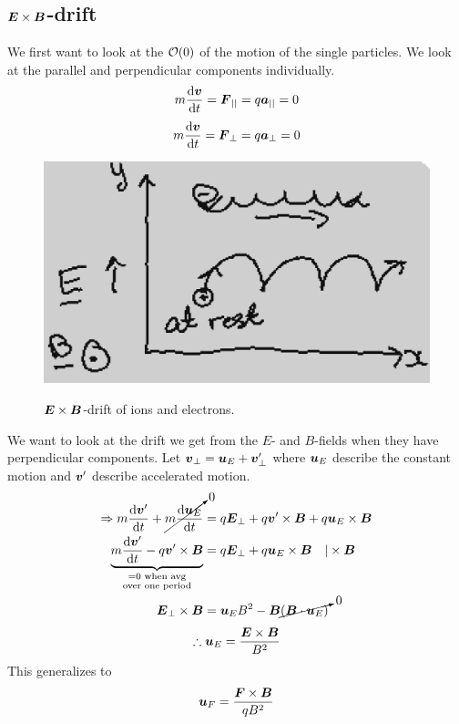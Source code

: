 \subsection{\(\boldsymbol{E}\times\boldsymbol{B}\)-drift}
We first want to look at the \(\mathcal{O}(0)\) of the motion of the single particles. We look at the parallel and perpendicular components individually. \boxed{\vert\vert:}
\begin{equation*}
    m\frac{\text{d}\boldsymbol{v}}{\text{d}t}=\boldsymbol{F}_{\vert\vert}=q\boldsymbol{a}_{\vert\vert}=0
\end{equation*}
\boxed{\perp:}
\begin{equation*}
    m\frac{\text{d}\boldsymbol{v}}{\text{d}t}=\boldsymbol{F}_\perp=q\boldsymbol{a}_\perp=0
\end{equation*}
\begin{figure}[t]
    \centering
    \includegraphics[width=0.2\linewidth]{bilder/ExB.jpg}\label{fig:ExB}
    \caption{\(\boldsymbol{E}\times\boldsymbol{B}\)-drift of ions and electrons.}
\end{figure}
We want to look at the drift we get from the \(E\)- and \(B\)-fields when they have perpendicular components. Let \(\boldsymbol{v}_\perp=\boldsymbol{u}_E+\boldsymbol{v}_\perp'\) where \(\boldsymbol{u}_E\) describe the constant motion and \(\boldsymbol{v}'\) describe accelerated motion.
\begin{align*}
    \Rightarrow m\frac{\text{d}\boldsymbol{v}'}{\text{d}t}+\cancelto{0}{m\frac{\textnormal{d}\boldsymbol{u}_E}{\textnormal{d}t}}&=q\boldsymbol{E}_\perp+q\boldsymbol{v}'\times\boldsymbol{B}+q\boldsymbol{u}_E\times\boldsymbol{B}\\
    \underbrace{m\frac{\textnormal{d}\boldsymbol{v}'}{\textnormal{d}t}-q\boldsymbol{v}'\times\boldsymbol{B}}_{\substack{=0 \textnormal{ when avg} \\\textnormal{over one period}}}&=q\boldsymbol{E}_\perp+q\boldsymbol{u}_E\times\boldsymbol{B}\quad\vert\times\boldsymbol{B}\\
    \boldsymbol{E}_\perp\times\boldsymbol{B}&=\boldsymbol{u}_{E}B^2-\boldsymbol{B}\cancelto{0}{(\boldsymbol{B}\cdot\boldsymbol{u}_E)}
\end{align*}
\begin{equation*}
    \therefore \boldsymbol{u}_E=\frac{\boldsymbol{E}\times\boldsymbol{B}}{B^2}
\end{equation*}
This generalizes to
\begin{equation}\label{eq:gen_v_drift}
    \boldsymbol{u}_F=\frac{\boldsymbol{F}\times\boldsymbol{B}}{qB^2}
\end{equation}

